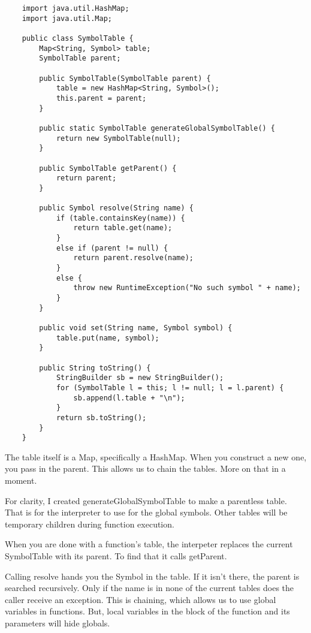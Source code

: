 {\footnotesize
\begin{verbatim}
    import java.util.HashMap;
    import java.util.Map;
    
    public class SymbolTable {
        Map<String, Symbol> table;
        SymbolTable parent;
    
        public SymbolTable(SymbolTable parent) {
            table = new HashMap<String, Symbol>();
            this.parent = parent;
        }
    
        public static SymbolTable generateGlobalSymbolTable() {
            return new SymbolTable(null);
        }
    
        public SymbolTable getParent() {
            return parent;
        }
    
        public Symbol resolve(String name) {
            if (table.containsKey(name)) {
                return table.get(name);
            }
            else if (parent != null) {
                return parent.resolve(name);
            }
            else {
                throw new RuntimeException("No such symbol " + name);
            }
        }
    
        public void set(String name, Symbol symbol) {
            table.put(name, symbol);
        }
    
        public String toString() {
            StringBuilder sb = new StringBuilder();
            for (SymbolTable l = this; l != null; l = l.parent) {
                sb.append(l.table + "\n");
            }
            return sb.toString();
        }
    }
\end{verbatim}
}

The table itself is a Map, specifically a HashMap. When you construct a new
one, you pass in the parent. This allows us to chain the tables. More on
that in a moment.

For clarity, I created generateGlobalSymbolTable to make a parentless table.
That is for the interpreter to use for the global symbols. Other tables will
be temporary children during function execution.

When you are done with a function's table, the interpeter replaces the
current SymbolTable with its parent. To find that it calls getParent.

Calling resolve hands you the Symbol in the table. If it isn't there, the
parent is searched recursively. Only if the name is in none of the current
tables does the caller receive an exception. This is chaining, which allows
us to use global variables in functions. But, local variables in the block
of the function and its parameters will hide globals.

